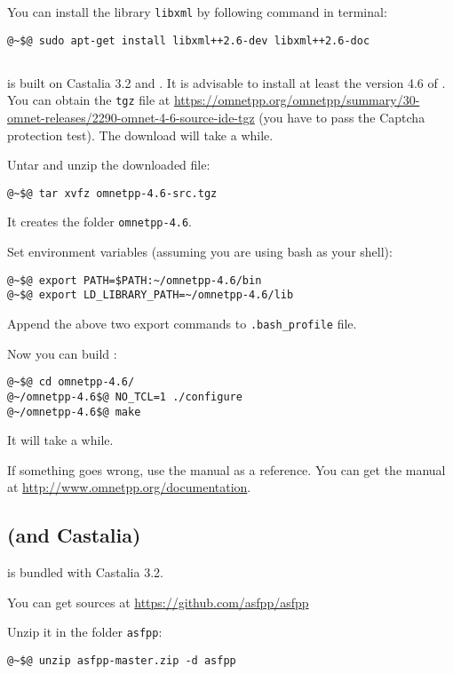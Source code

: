 You can install the library \texttt{libxml} by following command in terminal:
%
\begin{lstlisting}[language={terminal}]
@~$@ sudo apt-get install libxml++2.6-dev libxml++2.6-doc
\end{lstlisting}


\subsection{\omnet}
\asf is built on Castalia 3.2 and . It is advisable to install at least the version 4.6 of \omnet.
You can obtain the \texttt{tgz} file at \url{https://omnetpp.org/omnetpp/summary/30-omnet-releases/2290-omnet-4-6-source-ide-tgz} (you have to pass the Captcha protection test). The download will take a while.

Untar and unzip the downloaded file:
%
\begin{lstlisting}[language={terminal}]
@~$@ tar xvfz omnetpp-4.6-src.tgz
\end{lstlisting}
%
It creates the folder \texttt{omnetpp-4.6}.

Set environment variables (assuming you are using bash as your shell):
%
\begin{lstlisting}[language={terminal}]
@~$@ export PATH=$PATH:~/omnetpp-4.6/bin
@~$@ export LD_LIBRARY_PATH=~/omnetpp-4.6/lib
\end{lstlisting}
%
Append the above two export commands to \texttt{.bash\_profile} file.

Now you can build :
%
\begin{lstlisting}[language={terminal}]
@~$@ cd omnetpp-4.6/
@~/omnetpp-4.6$@ NO_TCL=1 ./configure
@~/omnetpp-4.6$@ make
\end{lstlisting}
%
It will take a while.

If something goes wrong, use the  manual as a reference. You can get the  manual at \url{http://www.omnetpp.org/documentation}.



\subsection{\asf (and Castalia)}
\label{sec:asfpp-install}
\asf is bundled with Castalia 3.2.

You can get \asf sources at \url{https://github.com/asfpp/asfpp}

Unzip it in the folder \texttt{asfpp}:
%
\begin{lstlisting}[language={terminal}]
@~$@ unzip asfpp-master.zip -d asfpp
\end{lstlisting}

